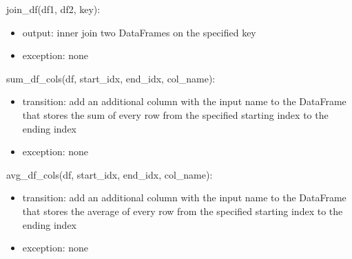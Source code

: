 \documentclass[12pt]{article}
\begin{document}
\noindent join\_df(df1, df2, key):
\begin{itemize}
    \item output: inner join two DataFrames on the specified key
    \item exception: none
\end{itemize}

\noindent sum\_df\_cols(df, start\_idx, end\_idx, col\_name):
\begin{itemize}
    \item transition: add an additional column with the input name to the DataFrame that stores the sum of 
    every row from the specified starting index to the ending index
    \item exception: none
\end{itemize}

\noindent avg\_df\_cols(df, start\_idx, end\_idx, col\_name):
\begin{itemize}
    \item transition: add an additional column with the input name to the DataFrame that stores the average of 
    every row from the specified starting index to the ending index
    \item exception: none
\end{itemize}



\end{document}

